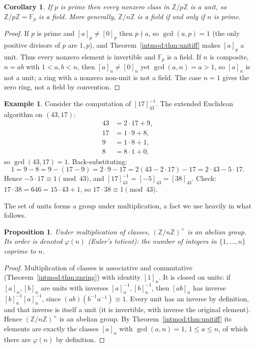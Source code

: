 \documentclass[11pt,a4paper]{article}
\newtheorem{proposition}[theorem]{Proposition}
\newtheorem{corollary}[theorem]{Corollary}
\theoremstyle{definition}
\newtheorem{example}[theorem]{Example}
\theoremstyle{remark}
\newcommand{\Z}{\ensuremath{\mathbb{Z}}}
\newcommand{\Fp}{\ensuremath{\mathbb{F}_{p}}}
\begin{document}
\begin{corollary}\label{intmod:cor:fpfield}
If \(p\) is prime then every nonzero class in \(\Z/p\Z\) is a unit, so \(\Z/p\Z=\Fp\) is a field. More generally, \(\Z/n\Z\) is a field if and only if \(n\) is prime.
\end{corollary}

\begin{proof}
If \(p\) is prime and \([a]_p\neq[0]_p\) then \(p\nmid a\), so \(\gcd(a,p)=1\) (the only positive divisors of \(p\) are \(1,p\)), and Theorem~\ref{intmod:thm:unitiff} makes \([a]_p\) a unit. Thus every nonzero element is invertible and \(\Fp\) is a field. If \(n\) is composite, \(n=ab\) with \(1<a,b<n\), then \([a]_n\neq[0]_n\) yet \(\gcd(a,n)=a>1\), so \([a]_n\) is not a unit; a ring with a nonzero non-unit is not a field. The case \(n=1\) gives the zero ring, not a field by convention.
\end{proof}

\begin{example}\label{intmod:exa:modinverse}
Consider the computation of \([17]_{43}^{-1}\). The extended Euclidean algorithm on \((43,17)\):
\[
\begin{aligned}
43 &= 2\cdot 17 + 9, \\
17 &= 1\cdot 9 + 8, \\
9 &= 1\cdot 8 + 1, \\
8 &= 8\cdot 1 + 0,
\end{aligned}
\]
so \(\gcd(43,17)=1\). Back-substituting:
\[
1 = 9 - 8 = 9 - (17-9) = 2\cdot 9 - 17 = 2(43-2\cdot 17) - 17 = 2\cdot 43 - 5\cdot 17.
\]
Hence \(-5\cdot 17 \equiv 1\pmod{43}\), and \([17]_{43}^{-1}=[-5]_{43}=[38]_{43}\). Check: \(17\cdot 38 = 646 = 15\cdot 43 + 1\), so \(17\cdot 38\equiv 1\pmod{43}\).
\end{example}

The set of units forms a group under multiplication, a fact we use heavily in what follows.

\begin{proposition}\label{intmod:prop:unitgroup}
Under multiplication of classes, \((\Z/n\Z)^\times\) is an abelian group. Its order is denoted \(\varphi(n)\) (\emph{Euler's totient}): the number of integers in \(\{1,\dots,n\}\) coprime to \(n\).
\end{proposition}

\begin{proof}
Multiplication of classes is associative and commutative (Theorem~\ref{intmod:thm:znring}) with identity \([1]_n\). It is closed on units: if \([a]_n,[b]_n\) are units with inverses \([a]_n^{-1},[b]_n^{-1}\), then \([ab]_n\) has inverse \([b]_n^{-1}[a]_n^{-1}\), since \((ab)(b^{-1}a^{-1})\equiv 1\). Every unit has an inverse by definition, and that inverse is itself a unit (it is invertible, with inverse the original element). Hence \((\Z/n\Z)^\times\) is an abelian group. By Theorem~\ref{intmod:thm:unitiff} its elements are exactly the classes \([a]_n\) with \(\gcd(a,n)=1\), \(1\le a\le n\), of which there are \(\varphi(n)\) by definition.
\end{proof}
\end{document}

